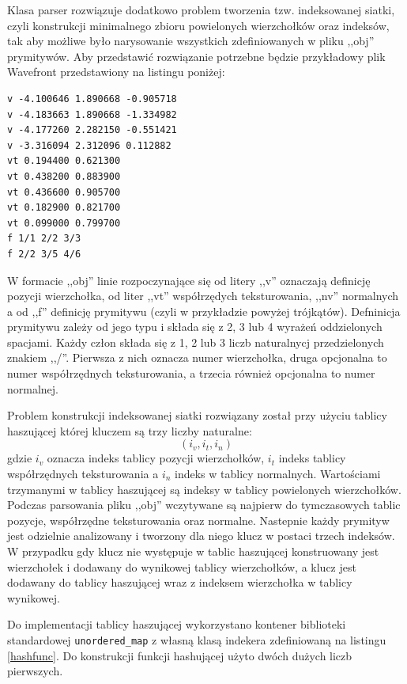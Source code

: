 {Klasa parser rozwiązuje dodatkowo problem tworzenia tzw. indeksowanej siatki,
czyli konstrukcji minimalnego zbioru powielonych wierzchołków oraz indeksów, tak aby możliwe
było narysowanie wszystkich zdefiniowanych w pliku ,,obj'' prymitywów. Aby
przedstawić rozwiązanie potrzebne będzie przykładowy plik Wavefront
przedstawiony na listingu poniżej:

\begin{lstlisting}[caption=Fragment pliku OBJ, label=obj_file]
v -4.100646 1.890668 -0.905718
v -4.183663 1.890668 -1.334982
v -4.177260 2.282150 -0.551421
v -3.316094 2.312096 0.112882
vt 0.194400 0.621300
vt 0.438200 0.883900
vt 0.436600 0.905700
vt 0.182900 0.821700
vt 0.099000 0.799700
f 1/1 2/2 3/3
f 2/2 3/5 4/6
\end{lstlisting}

W formacie ,,obj'' linie rozpoczynające się od litery ,,v'' oznaczają definicję
	pozycji wierzchołka, od liter ,,vt'' współrzędych teksturowania, ,,nv''
	normalnych a od ,,f''
	definicję prymitywu (czyli w przykładzie powyżej trójkątów). Defninicja
	prymitywu zależy od jego typu i składa się z 2, 3 lub 4 wyrażeń oddzielonych
	spacjami. Każdy człon składa się z 1, 2 lub 3 liczb naturalnycj przedzielonych znakiem
	,,/''. Pierwsza z nich oznacza numer wierzchołka, druga opcjonalna to numer
	współrzędnych teksturowania, a trzecia również opcjonalna to numer
	normalnej.
	
Problem konstrukcji indeksowanej siatki rozwiązany został przy użyciu tablicy
haszującej której kluczem są trzy liczby naturalne:
$$ (i_v, i_t, i_n) $$
gdzie $i_v$ oznacza indeks tablicy pozycji wierzchołków, $i_t$ indeks
tablicy współrzędnych
teksturowania a $i_n$ indeks w tablicy normalnych. Wartościami trzymanymi w
tablicy haszującej są indeksy w tablicy powielonych wierzchołków. Podczas parsowania pliku
,,obj'' wczytywane są najpierw do tymczasowych tablic pozycje, współrzędne
teksturowania oraz normalne. Nastepnie każdy prymityw jest odzielnie analizowany
i tworzony dla niego klucz w postaci trzech indeksów. W przypadku gdy klucz nie
występuje w tablic haszującej konstruowany jest wierzchołek i dodawany do
wynikowej tablicy wierzchołków, a klucz jest dodawany do tablicy haszującej
wraz z indeksem wierzchołka w tablicy wynikowej. 

Do implementacji tablicy haszującej wykorzystano kontener biblioteki
standardowej \texttt{unordered\_map} z własną klasą indekera zdefiniowaną na
listingu \ref{hashfunc}. Do konstrukcji funkcji hashującej użyto dwóch dużych
liczb pierwszych.

}
